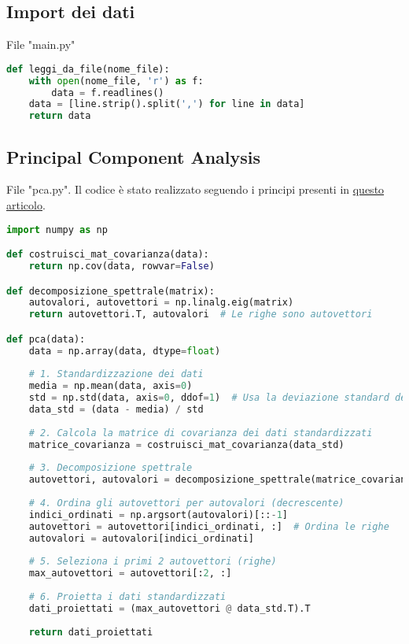 \documentclass[a4paper]{report}
\begin{document}
\subsection{Import dei dati}

File "main.py"
\begin{lstlisting}[language=Python]
def leggi_da_file(nome_file):
    with open(nome_file, 'r') as f:
        data = f.readlines()
    data = [line.strip().split(',') for line in data]
    return data
\end{lstlisting}

\subsection{Principal Component Analysis}

File "pca.py".
Il codice è stato realizzato seguendo i principi presenti in \href{https://builtin.com/data-science/step-step-explanation-principal-component-analysis}{questo articolo}.
\begin{lstlisting}[language=Python]
import numpy as np

def costruisci_mat_covarianza(data):
    return np.cov(data, rowvar=False)

def decomposizione_spettrale(matrix):
    autovalori, autovettori = np.linalg.eig(matrix)
    return autovettori.T, autovalori  # Le righe sono autovettori

def pca(data):
    data = np.array(data, dtype=float)
    
    # 1. Standardizzazione dei dati
    media = np.mean(data, axis=0)
    std = np.std(data, axis=0, ddof=1)  # Usa la deviazione standard del campione (ddof=1)
    data_std = (data - media) / std
    
    # 2. Calcola la matrice di covarianza dei dati standardizzati
    matrice_covarianza = costruisci_mat_covarianza(data_std)
    
    # 3. Decomposizione spettrale
    autovettori, autovalori = decomposizione_spettrale(matrice_covarianza)
    
    # 4. Ordina gli autovettori per autovalori (decrescente)
    indici_ordinati = np.argsort(autovalori)[::-1]
    autovettori = autovettori[indici_ordinati, :]  # Ordina le righe
    autovalori = autovalori[indici_ordinati]
    
    # 5. Seleziona i primi 2 autovettori (righe)
    max_autovettori = autovettori[:2, :]
    
    # 6. Proietta i dati standardizzati
    dati_proiettati = (max_autovettori @ data_std.T).T
    
    return dati_proiettati
\end{lstlisting}
\end{document}
